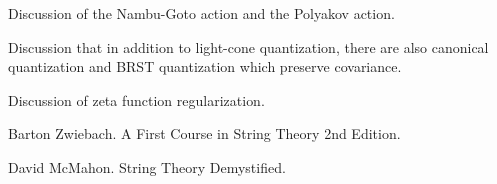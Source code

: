 \documentclass[uplatex]{jsarticle}
\begin{document}
Discussion of the Nambu-Goto action and the Polyakov action.

Discussion that in addition to light-cone quantization, there are also canonical quantization and BRST quantization which preserve covariance.

Discussion of zeta function regularization.


\begin{thebibliography}{9}

	Barton Zwiebach.
	\newblock A First Course in String Theory 2nd Edition.

	David McMahon.
	\newblock String Theory Demystified.

\end{thebibliography}
\end{document}
